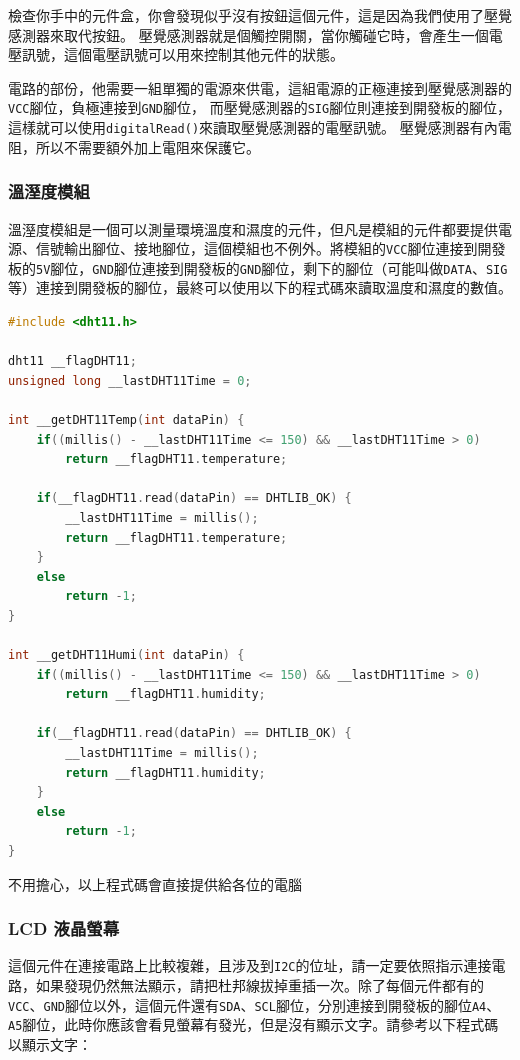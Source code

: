 \documentclass[12pt,a4paper]{article}
\begin{document}
檢查你手中的元件盒，你會發現似乎沒有按鈕這個元件，這是因為我們使用了壓覺感測器來取代按鈕。
壓覺感測器就是個觸控開關，當你觸碰它時，會產生一個電壓訊號，這個電壓訊號可以用來控制其他元件的狀態。

電路的部份，他需要一組單獨的電源來供電，這組電源的正極連接到壓覺感測器的\texttt{VCC}腳位，負極連接到\texttt{GND}腳位，
而壓覺感測器的\texttt{SIG}腳位則連接到開發板的腳位，
這樣就可以使用\texttt{digitalRead()}來讀取壓覺感測器的電壓訊號。
壓覺感測器有內電阻，所以不需要額外加上電阻來保護它。

\subsubsection{溫溼度模組}
溫溼度模組是一個可以測量環境溫度和濕度的元件，但凡是模組的元件都要提供電源、信號輸出腳位、接地腳位，這個模組也不例外。將模組的\texttt{VCC}腳位連接到開發板的\texttt{5V}腳位，\texttt{GND}腳位連接到開發板的\texttt{GND}腳位，剩下的腳位（可能叫做\texttt{DATA}、\texttt{SIG}等）連接到開發板的腳位，最終可以使用以下的程式碼來讀取溫度和濕度的數值。

\begin{lstlisting}[language=C++]
#include <dht11.h>

dht11 __flagDHT11;
unsigned long __lastDHT11Time = 0;

int __getDHT11Temp(int dataPin) {
    if((millis() - __lastDHT11Time <= 150) && __lastDHT11Time > 0)
        return __flagDHT11.temperature;

    if(__flagDHT11.read(dataPin) == DHTLIB_OK) {
        __lastDHT11Time = millis();
        return __flagDHT11.temperature;
    }
    else
        return -1;
}

int __getDHT11Humi(int dataPin) {
    if((millis() - __lastDHT11Time <= 150) && __lastDHT11Time > 0)
        return __flagDHT11.humidity;

    if(__flagDHT11.read(dataPin) == DHTLIB_OK) {
        __lastDHT11Time = millis();
        return __flagDHT11.humidity;
    }
    else
        return -1;
}
\end{lstlisting}

不用擔心，以上程式碼會直接提供給各位的電腦

\subsubsection{LCD 液晶螢幕}

這個元件在連接電路上比較複雜，且涉及到\texttt{I2C}的位址，請一定要依照指示連接電路，如果發現仍然無法顯示，請把杜邦線拔掉重插一次。除了每個元件都有的\texttt{VCC}、\texttt{GND}腳位以外，這個元件還有\texttt{SDA}、\texttt{SCL}腳位，分別連接到開發板的腳位\texttt{A4}、\texttt{A5}腳位，此時你應該會看見螢幕有發光，但是沒有顯示文字。請參考以下程式碼以顯示文字：
\end{document}
